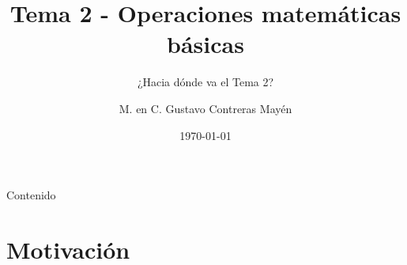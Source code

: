 



\makeatletter
\def\maketag@@@#1{\hbox{\m@th\normalfont\small#1}}
\makeatother
\title{Tema 2 - Operaciones matemáticas básicas}
\subtitle{¿Hacia dónde va el Tema 2?}
\author{M. en C. Gustavo Contreras Mayén}
\date{\today}

\maketitle
\fontsize{14}{14}\selectfont
{}
\begin{frame}{Contenido}
\tableofcontents[pausesections]
\end{frame}
\section{Motivación}
